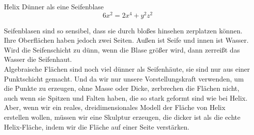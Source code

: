 \begin{surferPage}{Helix}
Dünner als eine Seifenblase\\
  \smallskip
\[6x^2	= 2x^4	+ y^2	z^2\]

\singlespacing
Seifenblasen sind so sensibel, dass sie durch bloßes hinsehen zerplatzen können. Ihre Oberflächen haben jedoch zwei Seiten. Außen ist Seife und innen ist Wasser. Wird die Seifenschicht zu dünn, wenn die Blase größer wird, dann zerreißt das Wasser die Seifenhaut.\\
\vspace{0,3cm}
Algebraische Flächen sind noch viel dünner als Seifenhäute, sie sind nur aus einer Punktschicht gemacht. Und da wir nur unsere Vorstellungskraft verwenden, um die Punkte zu erzeugen, ohne Masse oder Dicke, zerbrechen die Flächen nicht, auch wenn sie Spitzen und Falten haben, die so stark geformt sind wie bei Helix.\\
\vspace{0,3cm}
Aber, wenn wir ein reales, dreidimensionales Modell der Fläche von Helix erstellen wollen, müssen wir eine Skulptur erzeugen, die dicker ist als die echte Helix-Fläche, indem wir die Fläche auf einer Seite verstärken. 
\end{surferPage}
